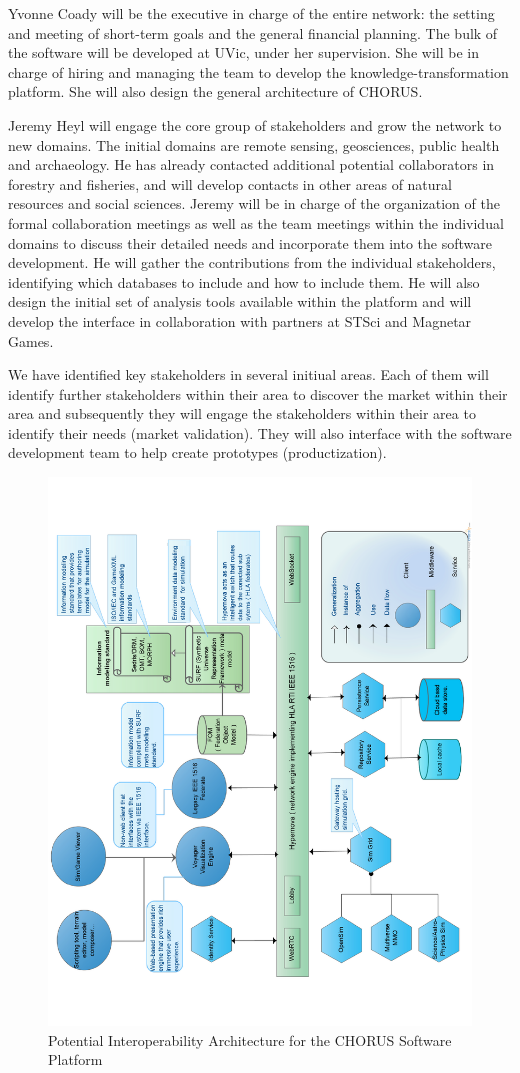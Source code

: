 Yvonne Coady will be the executive in charge of the entire network:
the setting and meeting of short-term goals and the general financial
planning.  The bulk of the software will be developed at UVic, under
her supervision. She will be in charge of hiring and managing the team
to develop the knowledge-transformation platform. She will also design
the general architecture of CHORUS.

Jeremy Heyl will engage the core group of stakeholders and grow the
network to new domains.  The initial domains are remote sensing,
geosciences, public health and archaeology.  He has already contacted
additional potential collaborators in forestry and fisheries, and will
develop contacts in other areas of natural resources and social
sciences.  Jeremy will be in charge of the organization of the formal
collaboration meetings as well as the team meetings within the
individual domains to discuss their detailed needs and incorporate
them into the software development. He will gather the contributions
from the individual stakeholders, identifying which databases to
include and how to include them.  He will also design the initial set
of analysis tools available within the platform and will develop the
interface in collaboration with partners at STSci and Magnetar Games.

We have identified key stakeholders in several initiual areas.  Each
of them will identify further stakeholders within their area to
discover the market within their area and subsequently they will
engage the stakeholders within their area to identify their needs
(market validation).  They will also interface with the software
development team to help create prototypes (productization).

\begin{figure}
  \includegraphics[height=\textwidth,angle=-90]{Arch2.pdf}
  \caption{Potential Interoperability Architecture for the CHORUS Software Platform}
\end{figure}
